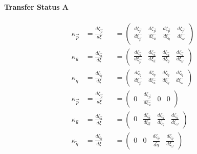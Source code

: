 \documentclass[review]{elsarticle}
\begin{document}
\paragraph{Transfer Status A}
\begin{equation} \begin{alignedat}{-1}
    \kappa_{\vec{p}}&=\frac{d\zeta_{\vec{p}}}{d\xi}&&=\left(\begin{array}{cccc}
        \frac{d\zeta_{\vec{p}}}{d\xi_{\vec{p}}} & \frac{d\zeta_{\vec{p}}}{d\xi_{\hat{u}}} & \frac{d\zeta_{\vec{p}}}{d\xi_{\tilde{\eta}}} & \frac{d\zeta_{\vec{p}}}{d\xi_{\omega}}
    \end{array}\right) \\
    \kappa_{\hat{u}}&=\frac{d\zeta_{\hat{u}}}{d\xi}&&=\left(\begin{array}{cccc}
        \frac{d\zeta_{\hat{u}}}{d\xi_{\vec{p}}} & \frac{d\zeta_{\hat{u}}}{d\xi_{\hat{u}}} & \frac{d\zeta_{\hat{u}}}{d\xi_{\tilde{\eta}}} & \frac{d\zeta_{\hat{u}}}{d\xi_{\omega}}
    \end{array}\right) \\
    \kappa_{\tilde{\eta}}&=\frac{d\zeta_{\tilde{\eta}}}{d\xi}&&=\left(\begin{array}{cccc}
        \frac{d\zeta_{\tilde{\eta}}}{d\xi_{\vec{p}}} & \frac{d\zeta_{\tilde{\eta}}}{d\xi_{\hat{u}}} & \frac{d\zeta_{\tilde{\eta}}}{d\xi_{\tilde{\eta}}} & \frac{d\zeta_{\tilde{\eta}}}{d\xi_{\omega}}
    \end{array}\right) \\
    \kappa_{\vec{p}}&=\frac{d\zeta_{\vec{p}}}{d\xi}&&=\left(\begin{array}{cccc}
        0 & \frac{d\zeta_{\vec{p}}}{d\xi_{\hat{u}}} & 0 & 0 
    \end{array}\right) \\
    \kappa_{\hat{u}}&=\frac{d\zeta_{\hat{u}}}{d\xi}&&=\left(\begin{array}{cccc}
        0 & \frac{d\zeta_{\hat{u}}}{d\xi_{\hat{u}}} & \frac{d\zeta_{\hat{u}}}{d\xi_{\tilde{\eta}}} & \frac{d\zeta_{\hat{u}}}{d\xi_{\omega}}
    \end{array}\right) \\
    \kappa_{\tilde{\eta}}&=\frac{d\zeta_{\tilde{\eta}}}{d\xi}&&=\left(\begin{array}{cccc}
        0 & 0 & \frac{d\zeta_{\tilde{\eta}}}{d\tilde{\eta}} & \frac{d\zeta_{\tilde{\eta}}}{d\xi_{\omega}}
    \end{array}\right) \\
\end{alignedat} \end{equation} 
\end{document}
